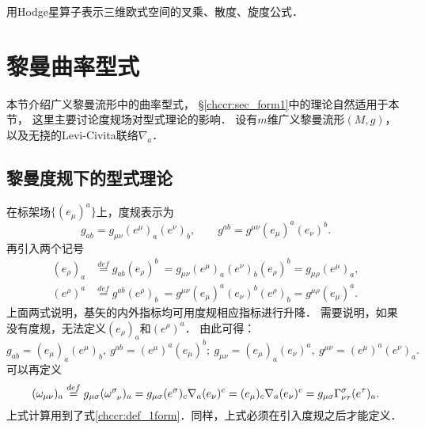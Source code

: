 \begin{exercise}
	用Hodge星算子表示三维欧式空间的叉乘、散度、旋度公式．
\end{exercise}




\section{黎曼曲率型式}\label{chrg:sec_form2}
本节介绍广义黎曼流形中的曲率型式\cite[\S 1.7]{chandrasekhar-1983}，
\S\ref{chccr:sec_form1}中的理论自然适用于本节，
这里主要讨论度规场对型式理论的影响．
设有$m$维广义黎曼流形$(M,g)$，以及无挠的Levi-Civita联络$\nabla_a$．


\subsection{黎曼度规下的型式理论}
在标架场$\{(e_\mu)^a\}$上，度规表示为
\begin{equation}
g_{ab}=g_{\mu\nu}(e^\mu)_a (e^\nu)_b, \qquad
g^{ab}=g^{\mu\nu}(e_\mu)^a (e_\nu)^b.
\end{equation}
再引入两个记号
\begin{align}
(e_\rho)_a &\overset{def}{=} g_{ab}(e_\rho)^b \
= g_{\mu\nu}(e^\mu)_a (e^\nu)_b (e_\rho)^b
= g_{\mu\rho}(e^\mu)_a, \\
(e^\rho)^a &\overset{def}{=} g^{ab}(e^\rho)_b \
= g^{\mu\nu}(e_\mu)^a (e_\nu)^b(e^\rho)_b
= g^{\mu\rho}(e_\mu)^a .
\end{align}
上面两式说明，基矢的内外指标均可用度规相应指标进行升降．
需要说明，如果没有度规，无法定义$(e_\rho)_a$和$(e^\rho)^a$．
由此可得：
\begin{equation}
  g_{ab}=(e_\mu)_a (e^\mu)_b, \  g^{ab}=(e^\mu)^a (e_\mu)^b ; \
  g_{\mu\nu}=(e_\mu)_a (e_\nu)^a, \  g^{\mu\nu}=(e^\mu)^a (e^\nu)_a .
\end{equation}
可以再定义
\begin{equation}
    (\omega _{\mu\nu})_{a} \overset{def}{=}
      g_{\mu\sigma} (\omega ^{\sigma}_{\hphantom{\sigma}\nu})_{a}
    = g_{\mu\sigma} (e^\sigma)_c \nabla _a (e_\nu)^c
    = (e_\mu)_c \nabla _a (e_\nu)^c
    = g_{\mu\sigma}\Gamma^{\sigma}_{\nu\tau} (e^\tau)_a .
\end{equation}
上式计算用到了式\eqref{chccr:def_1form}．同样，上式必须在引入度规之后才能定义．


